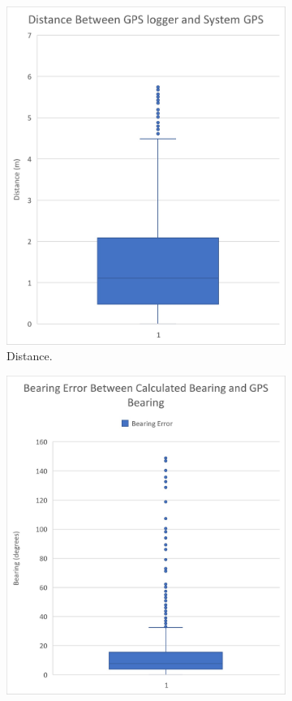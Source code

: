  \begin{figure}[!hb]
 	\begin{center}
 		\begin{subfigure}{0.45\linewidth}
 			\includegraphics[width = \linewidth]{figures/distBxWh.jpg}
 			\caption{Distance.}
 			\label{fig:4:GpsBxWh}	
 		\end{subfigure}
 		\begin{subfigure}{0.475\linewidth}
 			\includegraphics[width = \linewidth]{figures/bearingBxWh.jpg}

\end{subfigure}
\end{center}
\end{figure}
